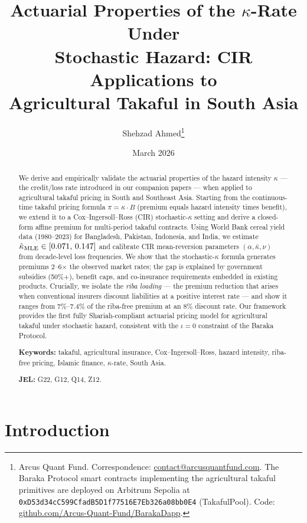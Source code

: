 \documentclass[12pt,a4paper]{article}
\title{%
  Actuarial Properties of the $\kappa$-Rate Under\\
  Stochastic Hazard: CIR Applications to\\
  Agricultural Takaful in South Asia%
}
\author{%
  Shehzad Ahmed\thanks{%
    Arcus Quant Fund. Correspondence: \href{mailto:contact@arcusquantfund.com}{contact@arcusquantfund.com}.
    The Baraka Protocol smart contracts implementing the agricultural takaful primitives
    are deployed on Arbitrum Sepolia at
    \texttt{0xD53d34cC599CfadB5D1f77516E7Eb326a08bb0E4} (TakafulPool).
    Code: \href{https://github.com/Arcus-Quant-Fund/BarakaDapp}{github.com/Arcus-Quant-Fund/BarakaDapp}.
  }%
}
\date{March 2026}
\newcommand{\khat}{\hat{\kappa}}
\newcommand{\kbar}{\bar{\kappa}}
\begin{document}
\maketitle

\begin{abstract}
\noindent
We derive and empirically validate the actuarial properties of the hazard intensity
$\kappa$ — the credit/loss rate introduced in our companion papers — when applied to
agricultural takaful pricing in South and Southeast Asia.
Starting from the continuous-time takaful pricing formula
$\pi = \kappa \cdot B$
(premium equals hazard intensity times benefit), we extend it to a
Cox--Ingersoll--Ross (CIR) stochastic-$\kappa$ setting and derive a closed-form
affine premium for multi-period takaful contracts.
Using World Bank cereal yield data (1980--2023) for Bangladesh, Pakistan, Indonesia,
and India, we estimate $\khat_{\rm MLE} \in [0.071,\,0.147]$ and calibrate CIR
mean-reversion parameters
$(\alpha,\kbar,\nu)$ from decade-level loss frequencies.
We show that the stochastic-$\kappa$ formula generates premiums 2--6$\times$ the
observed market rates; the gap is explained by government subsidies (50\%+),
benefit caps, and co-insurance requirements embedded in existing products.
Crucially, we isolate the \emph{riba loading} — the premium reduction that arises
when conventional insurers discount liabilities at a positive interest rate — and
show it ranges from 7\%--7.4\% of the riba-free premium at an 8\% discount rate.
Our framework provides the first fully Shariah-compliant actuarial pricing model for
agricultural takaful under stochastic hazard, consistent with the $\iota=0$
constraint of the Baraka Protocol.

\medskip\noindent
\textbf{Keywords:} takaful, agricultural insurance, Cox--Ingersoll--Ross,
hazard intensity, riba-free pricing, Islamic finance, $\kappa$-rate, South Asia.

\medskip\noindent
\textbf{JEL:} G22, G12, Q14, Z12.
\end{abstract}

\newpage
\tableofcontents
\newpage

\section{Introduction}
\label{sec:intro}
\end{document}
